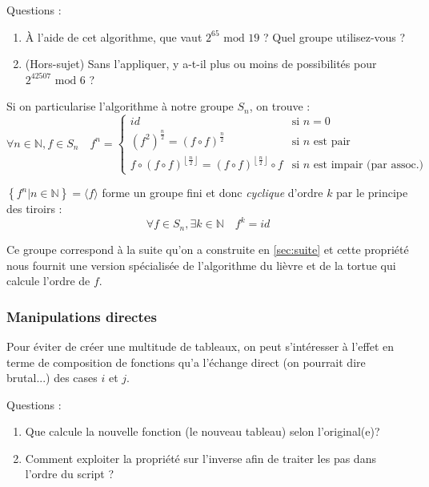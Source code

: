 \documentclass[11pt,a4paper,oneside]{book}
\begin{document}
Questions :
\begin{enumerate}
\item À l'aide de cet algorithme, que vaut $2^{65}\text{ mod }19$ ?
	Quel groupe utilisez-vous ?
\item (Hors-sujet) Sans l'appliquer, y a-t-il plus ou moins de possibilités pour
	$2^{42507}\text{ mod }6$ ?
\end{enumerate}

Si on particularise l'algorithme à notre groupe $S_n$, on trouve : \[
	\forall n \in \mathbb{N}, f \in S_n \quad
	f^n = \left\{\begin{array}{ll}
		id &
			\text{si $n=0$} \\
		\left(f^2\right)^{\frac n2} = \left(f\circ f\right)^{\frac n2} &
			\text{si $n$ est pair} \\
		f\circ \left(f\circ f\right)^{\left\lfloor\frac n2\right\rfloor} =
		\left(f\circ f\right)^{\left\lfloor\frac n2\right\rfloor}\circ f &
			\text{si $n$ est impair (par assoc.)}
	\end{array}\right.
\]

$\left\{f^n|n \in \mathbb{N}\right\}=\langle f\rangle$ forme un groupe fini
et donc \emph{cyclique} d'ordre $k$ par le principe des tiroirs : \[
	\forall f\in S_n, \exists k\in \mathbb{N} \quad f^k=id
\]

Ce groupe correspond à la suite qu'on a construite en \ref{sec:suite} et cette
propriété nous fournit une version spécialisée de l'algorithme du lièvre et de
la tortue qui calcule l'ordre de $f$.

\subsubsection{Manipulations directes}
Pour éviter de créer une multitude de tableaux, on peut s'intéresser à l'effet
en terme de composition de fonctions qu'a l'échange direct (on pourrait dire
brutal...) des cases $i$ et $j$.

Questions :
\begin{enumerate}
\item Que calcule la nouvelle fonction (le nouveau tableau) selon l'original(e)?
\item Comment exploiter la propriété sur l'inverse afin de traiter les pas dans
	l'ordre du script ?
\end{enumerate}
\end{document}
